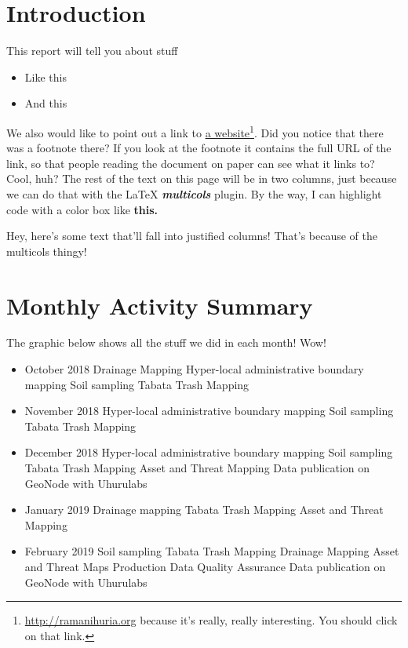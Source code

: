 \documentclass[a4paper,12pt,twoside]{article}
\begin{document}

\newpage
\section{Introduction}
\label{Introduction}

This report will tell you about stuff

\begin{itemize}
  \item Like this
  \item And this
\end{itemize}

We also would like to point out a link to  \href{https://ramanihuria.org}{a website}\footnote{\url{http://ramanihuria.org}\color{RHgrey} { }because it's really, really interesting. You should click on that link.}. Did you notice that there was a footnote there? If you look at the footnote it contains the full URL of the link, so that people reading the document on paper can see what it links to? Cool, huh? The rest of the text on this page will be in two columns, just because we can do that with the \LaTeX{} \textbf{\textit{multicols}} plugin. By the way, I can highlight code with a color box like \textbf{\colorbox{code}{this.}}

\begin{multicols}{2}
Hey, here's some text that'll fall into justified columns! That's because of the multicols thingy!
\end{multicols}

\newpage
\section{Monthly Activity Summary}

The graphic below shows all the stuff we did in each month! Wow!

\bigskip

\begin{itemize}
    \item October 2018
Drainage Mapping
Hyper-local administrative boundary mapping
Soil sampling
Tabata Trash Mapping
    \item November 2018
Hyper-local administrative boundary mapping
Soil sampling
Tabata Trash Mapping
    \item December 2018
Hyper-local administrative boundary mapping
Soil sampling
Tabata Trash Mapping
Asset and Threat Mapping
Data publication on GeoNode with Uhurulabs
    \item January 2019
Drainage mapping
Tabata Trash Mapping
Asset and Threat Mapping
    \item February 2019
Soil sampling
Tabata Trash Mapping
Drainage Mapping
Asset and Threat Maps Production
Data Quality Assurance
Data publication on GeoNode with Uhurulabs
\end{itemize}
\end{document}
